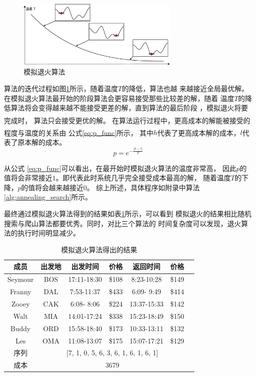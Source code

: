 \documentclass[fontset=fandol,a4paper,zihao=5]{ctexart}
\newcommand{\upcite}[1]{\textsuperscript{\textsuperscript{\cite{#1}}}}
\renewcommand{\eqref}[1]{公式 \ref{#1}}
\begin{document}
			
			\begin{figure}[!h]
				\centering
				\includegraphics[width=0.7\textwidth]{pic/annle.eps}
				\caption{\label{fig:annle}模拟退火算法}
			\end{figure}
			算法的迭代过程如图\ref{fig:annle}所示，随着温度$T$的降低，算法也越
            来越接近全局最优解。
			在模拟退火算法最开始的阶段算法会更容易接受那些比较差的解，随着
            温度$T$的降低算法将会变得越来越不能接受更差的解，直到算法的最后阶段
            ，模拟退火将要完成时，
            算法只会接受更优的解\upcite{高尚2002模拟退火算法中的退火策略研究}。
			在算法运行过程中，更高成本的解能被接受的程度与温度的关系由
            公式\ref{eq:p_func}所示\upcite{Kirkpatrick1987Optimization}，
            其中$h$代表了更高成本解的成本，$l$代表了原本解的成本。
			\begin{equation}
			    p=e^{-\frac{|h-l|}{T}}
			    \label{eq:p_func}
			\end{equation}
			
			从\eqref{eq:p_func}可以看出，在最开始时模拟退火算法的温度非常高，
            因此$p$的值将会非常接近$1$。即代表此时系统几乎完全接受成本最高的解，
            随着温度$T$的下降，$p$的值将会越来越接近$0$。
			综上所述，具体程序如附录中算法\ref{alg:annealing_search}所示。
            
			最终通过模拟退火算法得到的结果如表\ref{tab:annealing}所示，可以看到
            模拟退火的结果相比随机搜索与爬山算法都要优秀。同时，对比三个算法的
            时间复杂度可以发现，退火算法的执行时间明显减少。
			\begin{table}[!htbp]
				\centering
				\caption{模拟退火算法得出的结果}
				\label{tab:annealing}
				\begin{tabular}{ccccccc}
					\toprule[1pt]
					成员     & 出发地& 出发时间    &  价格  &  返回时间    &   价格 \\
					\midrule
					Seymour  &      BOS & 17:11-18:30 & \$108 &  8:23-10:28 & \$149 \\
					Franny   &   DAL  & 7:53-11:37 & \$433  & 6:09- 9:49 & \$414 \\
					Zooey    &   CAK  & 6:08- 8:06 & \$224 & 13:37-15:33 & \$142 \\
					Walt     &  MIA & 14:01-17:24 & \$338 & 15:23-18:49 & \$150 \\
					Buddy    &   ORD & 15:58-18:40 & \$173 & 10:33-13:11 & \$132 \\
					Les      & OMA  & 11:08-13:07 & \$175 & 15:07-17:21 & \$129 \\
					\midrule
					序列    & \multicolumn{5}{c}{[7, 1, 0, 5, 6, 3, 6, 1, 6, 1, 6, 1]} \\
					成本    & \multicolumn{5}{c}{3679} \\
					\bottomrule[1pt]
				\end{tabular} 
			\end{table}
\end{document}
